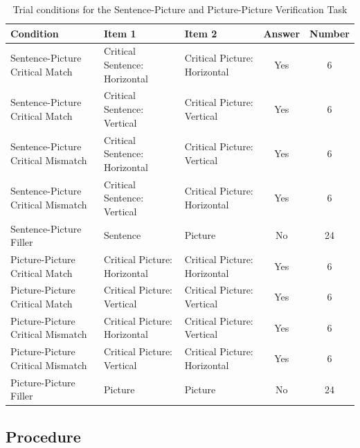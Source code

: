 \documentclass[
  man,floatsintext]{apa7}
\begin{document}
\begin{table}[tbp]

\begin{center}
\begin{threeparttable}

\caption{\label{tab:stim-table}Trial conditions for the Sentence-Picture and Picture-Picture Verification Task}

\scriptsize{

\begin{tabular}{lllcc}
\toprule
Condition & Item 1 & Item 2 & Answer & Number\\
\midrule
Sentence-Picture
Critical
Match & Critical Sentence:
Horizontal & Critical Picture:
Horizontal & Yes & 6\\
Sentence-Picture
Critical
Match & Critical Sentence:
Vertical & Critical Picture:
Vertical & Yes & 6\\
Sentence-Picture
Critical
Mismatch & Critical Sentence:
Horizontal & Critical Picture:
Vertical & Yes & 6\\
Sentence-Picture
Critical
Mismatch & Critical Sentence:
Vertical & Critical Picture:
Horizontal & Yes & 6\\
Sentence-Picture
Filler & Sentence & Picture & No & 24\\
Picture-Picture
Critical
Match & Critical Picture:
Horizontal & Critical Picture:
Horizontal & Yes & 6\\
Picture-Picture
Critical
Match & Critical Picture:
Vertical & Critical Picture:
Vertical & Yes & 6\\
Picture-Picture
Critical
Mismatch & Critical Picture:
Horizontal & Critical Picture:
Vertical & Yes & 6\\
Picture-Picture
Critical
Mismatch & Critical Picture:
Vertical & Critical Picture:
Horizontal & Yes & 6\\
Picture-Picture
Filler & Picture & Picture & No & 24\\
\bottomrule
\end{tabular}

}

\end{threeparttable}
\end{center}

\end{table}

\hypertarget{procedure}{%
\subsection{Procedure}\label{procedure}}
\end{document}

